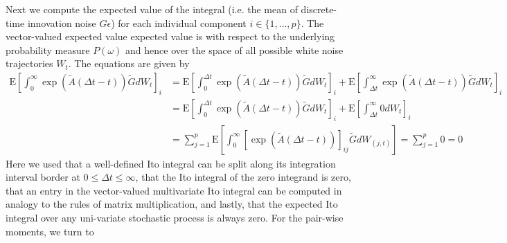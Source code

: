 \documentclass[10pt,letterpaper]{article}
\begin{document}
Next we compute the expected value of the integral (i.e. the mean of discrete-time innovation noise $G \epsilon$) for each individual component $i \in \{1, \ldots, p\}$. The vector-valued expected value expected value is with respect to the underlying probability measure $P(\omega)$ and hence over the space of all possible white noise trajectories $W_t$. The equations are given by
\begin{align}
\mbox{E}\left[\int_0^\infty \exp(\tilde{A}(\Delta{}t - t)) \tilde{G} dW_t\right]_i &=  
\mbox{E} \left[\int_0^{\Delta{}t} \exp(\tilde{A}(\Delta{}t - t)) \tilde{G} dW_t \right]_i + \mbox{E} \left[\int_{\Delta{}t}^\infty \exp(\tilde{A}(\Delta{}t - t)) \tilde{G} dW_t \right]_i \\
&= \mbox{E} \left[\int_0^{\Delta{}t} \exp(\tilde{A}(\Delta{}t - t)) \tilde{G} dW_t \right]_i + \mbox{E} \left[\int_{\Delta{}t}^\infty 0 dW_t \right]_i \\
&= \sum_{j=1}^p \mbox{E}\left[\int_0^\infty \left[\exp(\tilde{A}(\Delta{}t - t))\right]_{ij} \tilde{G} dW_{(j,t)}\right] = \sum_{j=1}^p 0 = 0
\end{align}
Here we used that a well-defined Ito integral can be split along its integration interval border at $0 \leq \Delta{}t \leq \infty$, that the Ito integral of the zero integrand is zero, that an entry in the vector-valued multivariate Ito integral can be computed in analogy to the rules of matrix multiplication, and lastly, that the expected Ito integral over any uni-variate stochastic process is always zero. For the pair-wise moments, we turn to 
\end{document}
